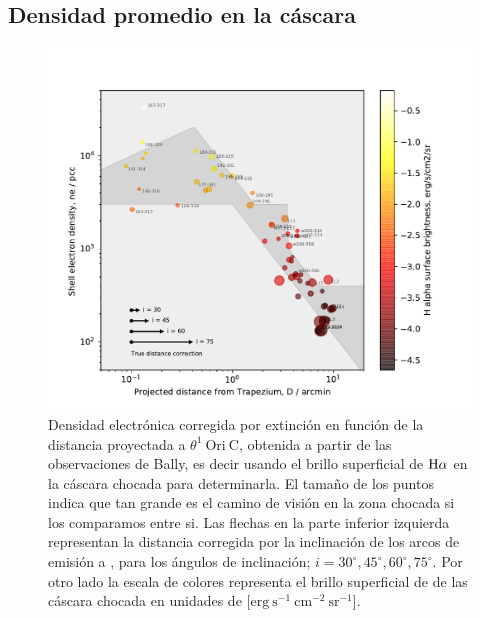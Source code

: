 \subsection{Densidad promedio en la cáscara}
\label{sec:density}

\begin{figure}
  \centering
   \includegraphics[width=\linewidth, clip]{luis-programas/will-nshell-vs-D.pdf}
  \caption{Densidad electrónica corregida por extinción en función de la distancia proyectada a \(\theta^1\ \text{Ori}\ \text{C}\), obtenida a partir de las observaciones de Bally, es decir usando el  brillo superficial de \(\mathrm{H}\alpha\) en la cáscara chocada para determinarla. El tamaño de los puntos indica que tan grande es el camino de visión en la zona chocada si los comparamos entre si. Las flechas en la parte inferior izquierda representan la distancia corregida por la inclinación de los arcos de emisión a \thC{}, para los ángulos de inclinación; \(i = 30^{\circ}, 45^{\circ}, 60^{\circ}, 75^{\circ}\).  Por otro lado la escala de colores representa el brillo superficial de \ha{} de las cáscara chocada en unidades de [\(\mathrm{erg~s^{-1}~cm^{-2}~sr^{-1}}\)]. }
  \label{fig:density}
\end{figure}

